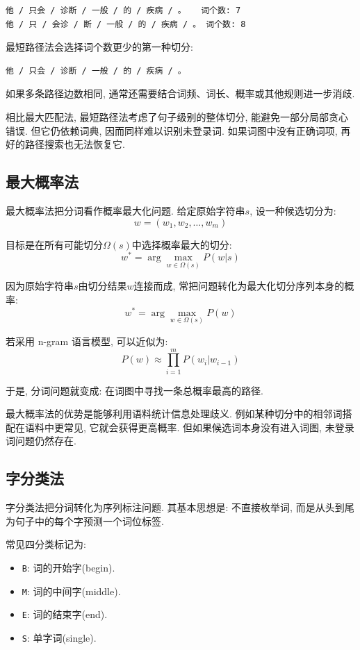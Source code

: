 \begin{Verbatim}[breaklines=true,breakanywhere=true,fontsize=\small]
他 / 只会 / 诊断 / 一般 / 的 / 疾病 / 。   词个数: 7
他 / 只 / 会诊 / 断 / 一般 / 的 / 疾病 / 。 词个数: 8
\end{Verbatim}

最短路径法会选择词个数更少的第一种切分:

\begin{Verbatim}[breaklines=true,breakanywhere=true,fontsize=\small]
他 / 只会 / 诊断 / 一般 / 的 / 疾病 / 。
\end{Verbatim}

如果多条路径边数相同, 通常还需要结合词频、词长、概率或其他规则进一步消歧.

相比最大匹配法, 最短路径法考虑了句子级别的整体切分, 能避免一部分局部贪心错误.
但它仍依赖词典, 因而同样难以识别未登录词.
如果词图中没有正确词项, 再好的路径搜索也无法恢复它.

\subsection{最大概率法}


最大概率法把分词看作概率最大化问题.
给定原始字符串$s$, 设一种候选切分为:
\[
w = (w_1, w_2, \dots, w_m)
\]

目标是在所有可能切分$\Omega(s)$中选择概率最大的切分:
\[
w^* = \arg\max_{w \in \Omega(s)} P(w | s)
\]

因为原始字符串$s$由切分结果$w$连接而成, 常把问题转化为最大化切分序列本身的概率:
\[
w^* = \arg\max_{w \in \Omega(s)} P(w)
\]

若采用 n-gram 语言模型, 可以近似为:
\[
P(w) \approx \prod_{i=1}^m P(w_i | w_{i-1})
\]

于是, 分词问题就变成:
在词图中寻找一条总概率最高的路径.

最大概率法的优势是能够利用语料统计信息处理歧义.
例如某种切分中的相邻词搭配在语料中更常见, 它就会获得更高概率.
但如果候选词本身没有进入词图, 未登录词问题仍然存在.

\subsection{字分类法}


字分类法把分词转化为序列标注问题.
其基本思想是: 不直接枚举词, 而是从头到尾为句子中的每个字预测一个词位标签.

常见四分类标记为:

\begin{itemize}
\item \texttt{B}: 词的开始字(begin).
\item \texttt{M}: 词的中间字(middle).
\item \texttt{E}: 词的结束字(end).
\item \texttt{S}: 单字词(single).
\end{itemize}

